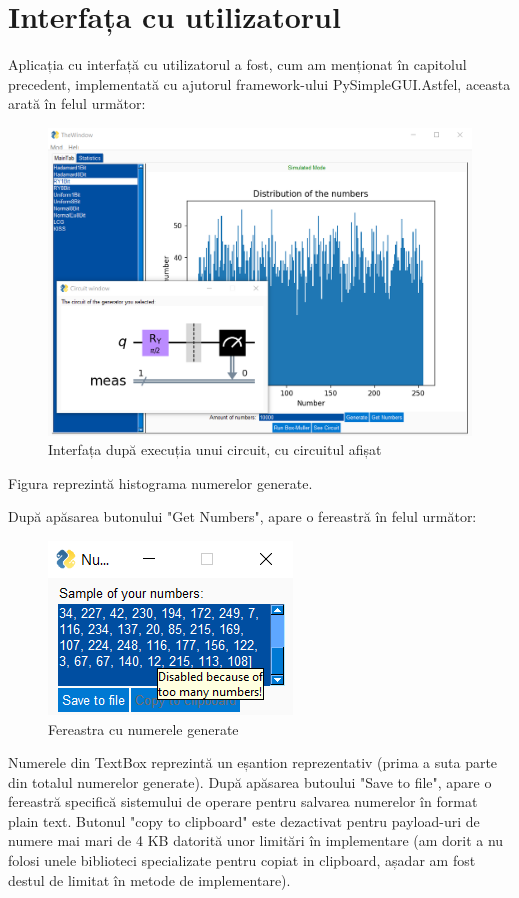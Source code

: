 \section{Interfața cu utilizatorul}
Aplicația cu interfață cu utilizatorul a fost, cum am menționat în capitolul precedent, implementată cu ajutorul framework-ului PySimpleGUI.Astfel, aceasta arată în felul următor:
\begin{figure}[H]
    \centering
    \includegraphics[width=1.0\textwidth]{continut/capitol3/figuri/InterfataCircuit.png}
    \caption{Interfața după execuția unui circuit, cu circuitul afișat}
    \label{fig:InterfataCircuit}
\end{figure}
Figura reprezintă histograma numerelor generate. 

După apăsarea butonului "Get Numbers", apare o fereastră în felul următor:

\begin{figure}[H]
    \centering
    \includegraphics{continut/capitol3/figuri/Numere.png}
    \caption{Fereastra cu numerele generate}
    \label{fig:FereastraNumere}
\end{figure}
Numerele din TextBox reprezintă un eșantion reprezentativ (prima a suta parte din totalul numerelor generate). După apăsarea butoului "Save to file", apare o fereastră specifică sistemului de operare pentru salvarea numerelor în format plain text. Butonul "copy to clipboard" este dezactivat pentru payload-uri de numere mai mari de 4 KB datorită unor limitări în implementare (am dorit a nu folosi unele biblioteci specializate pentru copiat in clipboard, așadar am fost destul de limitat în metode de implementare).

